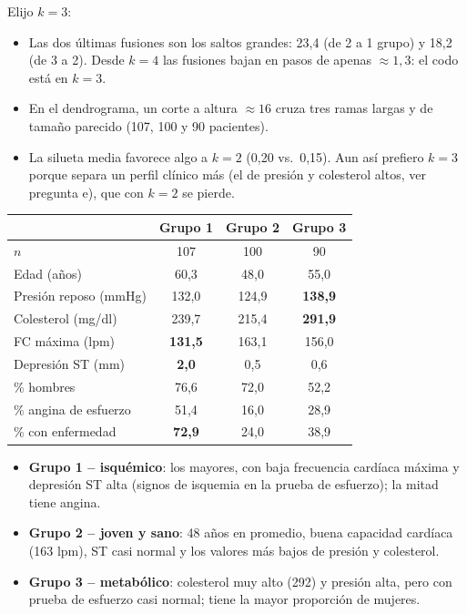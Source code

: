 Elijo \textbf{$k=3$}:
\begin{itemize}[leftmargin=1.2em]
  \item[\color{cTeal}\faCut] Las dos últimas fusiones son los saltos grandes: 23,4 (de 2 a 1 grupo) y 18,2 (de
  3 a 2). Desde $k=4$ las fusiones bajan en pasos de apenas $\approx1,3$: el codo está en $k=3$.
  \item[\color{cTeal}\faCut] En el dendrograma, un corte a altura $\approx 16$ cruza tres ramas largas y de
  tamaño parecido (107, 100 y 90 pacientes).
  \item[\color{cRed}\faCut] La silueta media favorece algo a $k=2$ (0,20 vs.\ 0,15). Aun así prefiero $k=3$
  porque separa un perfil clínico más (el de presión y colesterol altos, ver pregunta e), que con $k=2$ se pierde.
\end{itemize}

\begin{center}\small
\begin{tabular}{lccc}
\toprule
& \textbf{Grupo 1} & \textbf{Grupo 2} & \textbf{Grupo 3} \\ \midrule
$n$ & 107 & 100 & 90 \\
Edad (años) & 60,3 & 48,0 & 55,0 \\
Presión reposo (mmHg) & 132,0 & 124,9 & \textbf{138,9} \\
Colesterol (mg/dl) & 239,7 & 215,4 & \textbf{291,9} \\
FC máxima (lpm) & \textbf{131,5} & 163,1 & 156,0 \\
Depresión ST (mm) & \textbf{2,0} & 0,5 & 0,6 \\
\% hombres & 76,6 & 72,0 & 52,2 \\
\% angina de esfuerzo & 51,4 & 16,0 & 28,9 \\ \midrule
\% con enfermedad & \textbf{72,9} & 24,0 & 38,9 \\ \bottomrule
\end{tabular}
\end{center}
\begin{itemize}[leftmargin=1.2em]
  \item[\color{cRed}\faHeartbeat] \textbf{Grupo 1 -- isquémico}: los mayores, con baja frecuencia cardíaca
  máxima y depresión ST alta (signos de isquemia en la prueba de esfuerzo); la mitad tiene angina.
  \item[\color{cTeal}\faRunning] \textbf{Grupo 2 -- joven y sano}: 48 años en promedio, buena capacidad
  cardíaca (163 lpm), ST casi normal y los valores más bajos de presión y colesterol.
  \item[\color{cPurple}\faTint] \textbf{Grupo 3 -- metabólico}: colesterol muy alto (292) y presión alta, pero
  con prueba de esfuerzo casi normal; tiene la mayor proporción de mujeres.
\end{itemize}


